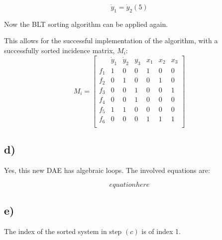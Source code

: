 \documentclass[10pt]{article}
\begin{document}
\begin{equation*}
\dot y_1 = \dot y_2 (5)
\end{equation*}

Now the BLT sorting algorithm can be applied again.  

This allows for the successful implementation of the algorithm, with a successfully sorted incidence matrix, $M_i$:
\[
M_i = 
\left[
\begin{array}{c|cccccc}
   & \dot y_1  & \dot y_2 & y_3 & x_1  & x_2 & x_3 \\ \hline 
f_1 &  1 & 0 & 0 & 1 & 0 & 0 \\
f_2 &  0 & 1 & 0 & 0 & 1 & 0 \\
f_3 &  0 & 0 & 1 & 0 & 0 & 1 \\
f_4 &  0 & 0 & 1 & 0 & 0 & 0 \\
f_5 &  1 & 1 & 0 & 0 & 0 & 0 \\
f_6 &  0 & 0 & 0 & 1 & 1 & 1 \\
\end{array}
\right]
\]


\subsection*{d)}

Yes, this new DAE has algebraic loops.  The involved equations are:

\begin{equation*}
equation here
\end{equation*}

\subsection*{e)}

The index of the sorted system in step $(c)$ is of index 1.

\end{document}
